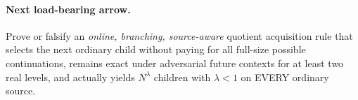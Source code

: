 \documentclass[11pt]{article}
\begin{document}
\paragraph{Next load-bearing arrow.} Prove or falsify an
\emph{online, branching, source-aware} quotient acquisition rule that
selects the next ordinary child without paying for all full-size
possible continuations, remains exact under adversarial future
contexts for at least two real levels, and actually yields
$N^\lambda$ children with $\lambda<1$ on EVERY ordinary source.
\end{document}
